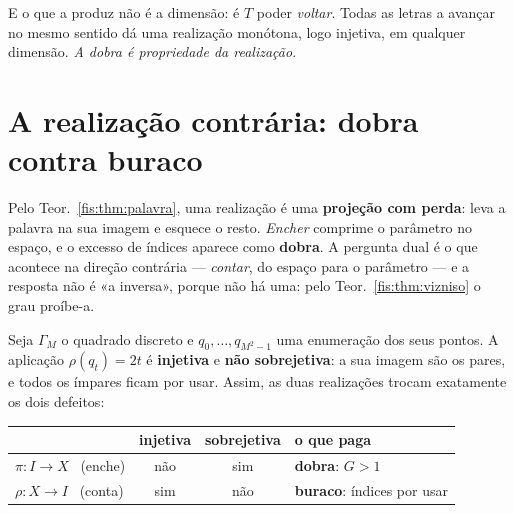 \documentclass[livro.tex]{subfiles}
\begin{document}
\medskip\noindent E o que a produz não é a dimensão: é $T$ poder \emph{voltar}.
Todas as letras a avançar no mesmo sentido dá uma realização monótona, logo
injetiva, em qualquer dimensão. \emph{A dobra é propriedade da realização.}


\section{A realização contrária: dobra contra buraco}\label{fis:folga}

\noindent Pelo Teor.~\ref{fis:thm:palavra}, uma realização é uma \textbf{projeção
com perda}: leva a palavra na sua imagem e esquece o resto. \emph{Encher}
comprime o parâmetro no espaço, e o excesso de índices aparece como
\textbf{dobra}. A pergunta dual é o que acontece na direção contrária ---
\emph{contar}, do espaço para o parâmetro --- e a resposta não é «a inversa»,
porque não há uma: pelo Teor.~\ref{fis:thm:vizniso} o grau proíbe-a.

\begin{teorema}\label{fis:thm:contraria}
Seja $\Gamma_M$ o quadrado discreto e $q_0,\dots,q_{M^2-1}$ uma enumeração dos
seus pontos. A aplicação $\rho(q_t)=2t$ é \textbf{injetiva} e \textbf{não
sobrejetiva}: a sua imagem são os pares, e todos os ímpares ficam por usar.
Assim, as duas realizações trocam exatamente os dois defeitos:
\begin{center}\small
\begin{tabular}{@{}lccl@{}}
\toprule
 & injetiva & sobrejetiva & o que paga \\
\midrule
$\pi\colon I\to X$ \ (enche) & não & sim & \textbf{dobra}: $G>1$ \\
$\rho\colon X\to I$ \ (conta) & sim & não & \textbf{buraco}: índices por usar \\
\bottomrule
\end{tabular}
\end{center}
\end{teorema}
\end{document}
